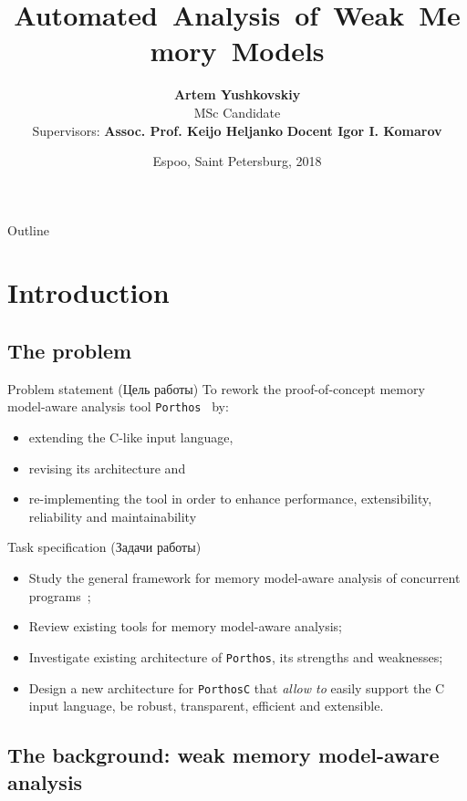 \documentclass{beamer}
\title{\nohyphens{\textbf{Automated~Analysis~of~Weak~Memory~Models}}}
\author{\textbf{Artem Yushkovskiy}\inst{1,2} \\ 
{\scriptsize MSc Candidate}
\\ \vspace{1em}
{\footnotesize\raggedleft Supervisors: \textbf{Assoc. Prof. Keijo Heljanko}\inst{1} \newline
\hphantom{Supervis} \textbf{Docent Igor I. Komarov}\inst{2} }
}%
\institute %
{
  \inst{1}%
  Department of Computer Science, \\
  School of Science, \\
  \textbf{Aalto University} (Espoo, Finland)%
  \and
  \inst{2}%
  Faculty of Information Security \\
  and Computer Technologies, \\
  \textbf{ITMO University} (Saint Petersburg, Russia)%
}
\date{\scriptsize Espoo, Saint Petersburg, 2018}
\begin{document}
\begin{frame}
  \titlepage
\end{frame}

\begin{frame}{Outline}
  \tableofcontents
\end{frame}


\section{Introduction}

\subsection{The problem}


\begin{frame}{Problem statement (Цель работы)}
To rework the proof-of-concept memory model-aware analysis tool \texttt{Porthos}~\cite{Porthos17a} by:
\begin{itemize}
\item extending the C-like input language,
\item revising its architecture and
\item re-implementing the tool in order to enhance performance, extensibility, reliability and maintainability
\end{itemize}
\end{frame}


\begin{frame}{Task specification (Задачи работы)}
\begin{itemize}
\item Study the general framework for memory model-aware analysis of concurrent programs~\cite{alglave2010shared};
\item Review existing tools for memory model-aware analysis;
\item Investigate existing architecture of \texttt{Porthos}, its strengths and weaknesses;
\item Design a new architecture for \texttt{PorthosC} that \textit{allow to} easily support the C input language, be robust, transparent, efficient and extensible.
\end{itemize}
\end{frame}


\subsection{The background: weak memory model-aware analysis}
\end{document}
